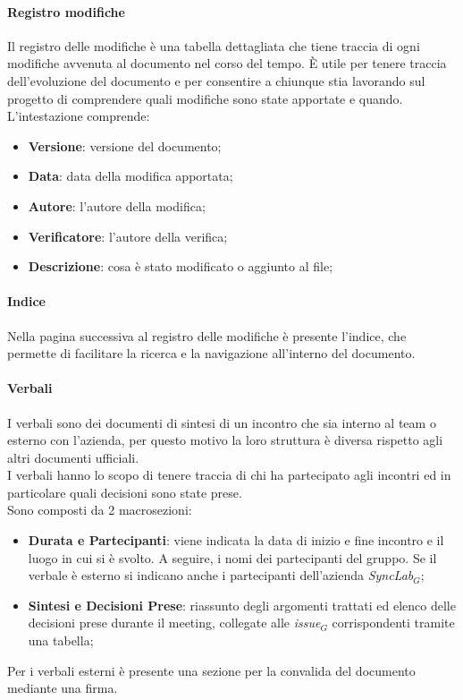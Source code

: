     \paragraph{Registro modifiche}
    Il registro delle modifiche è una tabella dettagliata che tiene traccia di ogni modifiche avvenuta al documento nel corso del tempo. È utile per tenere traccia dell’evoluzione del documento e per consentire a chiunque stia lavorando sul progetto di comprendere quali modifiche sono state apportate e quando.
    L’intestazione comprende:
    \begin{itemize}
    \item \textbf{Versione}: versione del documento;
    \item \textbf{Data}: data della modifica apportata;
    \item \textbf{Autore}: l’autore della modifica;
    \item \textbf{Verificatore}: l’autore della verifica;
    \item \textbf{Descrizione}: cosa è stato modificato o aggiunto al file;
    \end{itemize}

    \paragraph{Indice}
    Nella pagina successiva al registro delle modifiche è presente l’indice, che permette di facilitare la ricerca e la navigazione all’interno del documento. \\

    \paragraph{Verbali}
    I verbali sono dei documenti di sintesi di un incontro che sia interno al team o esterno con l'azienda, per questo motivo la loro struttura è diversa rispetto agli altri documenti ufficiali.\\
    I verbali hanno lo scopo di tenere traccia di chi ha partecipato agli incontri ed in particolare quali decisioni sono state prese.\\
    Sono composti da 2 macrosezioni:
    \begin{itemize}
    \item  \textbf{Durata e Partecipanti}: viene indicata la data di inizio e fine incontro e il luogo in cui si è svolto. A seguire, i nomi dei partecipanti del gruppo. Se il verbale è esterno si indicano anche i partecipanti dell'azienda \textit{SyncLab}$_G$;
    \item  \textbf{Sintesi e Decisioni Prese}: riassunto degli argomenti trattati ed elenco delle decisioni prese durante il meeting, collegate alle \textit{issue}$_G$ corrispondenti tramite una tabella;
    \end{itemize}
    Per i verbali esterni è presente una sezione per la convalida del documento mediante una firma.\\

